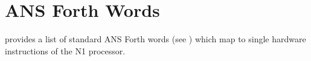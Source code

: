 
\section{ANS Forth Words}
\label{N1_words}

 provides a list of standard ANS Forth words (see \cite{dpans94})
which map to single hardware instructions of the N1 processor. 

